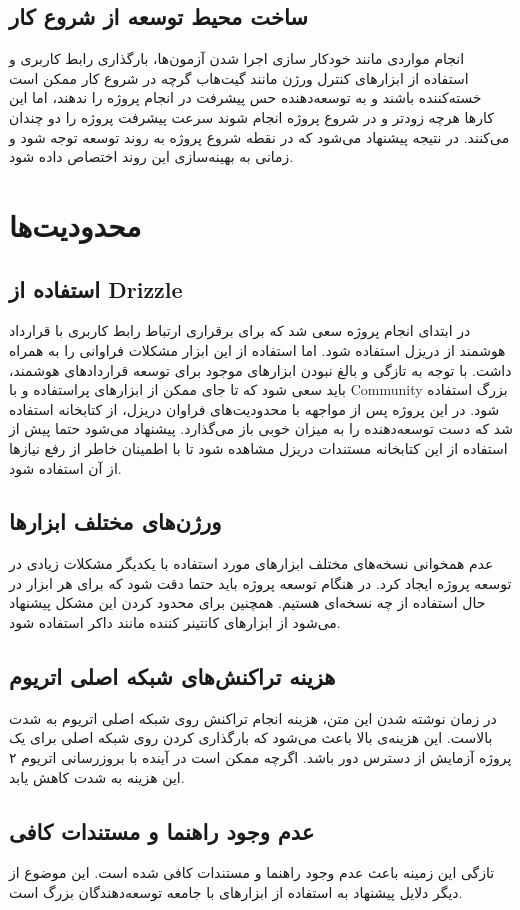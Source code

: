 \subsection{ساخت محیط توسعه از شروع کار}
انجام مواردی مانند خودکار سازی اجرا شدن آزمون‌ها،
بارگذاری رابط کاربری و استفاده از ابزارهای کنترل ورژن مانند گیت‌هاب
گرچه در شروع کار ممکن است خسته‌کننده باشند و به توسعه‌دهنده حس پیشرفت در انجام پروژه را ندهند، اما
این کارها هرچه زودتر و در شروع پروژه انجام شوند سرعت پیشرفت پروژه را دو چندان می‌کنند.
در نتیجه پیشنهاد می‌شود که در نقطه شروع پروژه به روند توسعه توجه شود و زمانی به
بهینه‌سازی این روند اختصاص داده شود.


\section{محدودیت‌ها}

\subsection{استفاده از
\gls{Drizzle}
}
در ابتدای انجام پروژه سعی شد که برای برقراری ارتباط رابط کاربری با قرارداد هوشمند از دریزل استفاده شود.
اما استفاده از این ابزار مشکلات فراوانی را به همراه داشت.
با توجه به تازگی و بالغ نبودن ابزارهای موجود برای توسعه قراردادهای هوشمند،
باید سعی شود که تا جای ممکن از ابزارهای پراستفاده و با
\gls{Community}
بزرگ استفاده شود. در این پروژه پس از مواجهه با محدودیت‌های فراوان دریزل،
از کتابخانه‌  استفاده شد که دست توسعه‌دهنده را به میزان خوبی باز می‌گذارد.
پیشنهاد می‌شود حتما پیش از استفاده از این کتابخانه مستندات دریزل
\cite{DrizzleDocs}
مشاهده شود تا با اطمینان خاطر از رفع نیازها از آن استفاده شود.

\subsection{ورژن‌های مختلف ابزارها}
عدم همخوانی نسخه‌های مختلف ابزارهای مورد استفاده با یکدیگر مشکلات زیادی در توسعه پروژه ایجاد کرد.
در هنگام توسعه پروژه باید حتما دقت شود که برای هر ابزار در حال استفاده از چه نسخه‌ای هستیم.
همچنین برای محدود کردن این مشکل پیشنهاد می‌شود از ابزارهای کانتینر کننده مانند داکر استفاده شود.

\subsection{هزینه تراکنش‌های شبکه اصلی اتریوم}
در زمان نوشته شدن این متن، هزینه انجام تراکنش روی شبکه اصلی اتریوم به شدت بالاست.
این هزینه‌ی بالا باعث می‌شود که بارگذاری کردن روی شبکه اصلی برای یک پروژه آزمایش از دسترس دور باشد.
اگرچه ممکن است در آینده با بروزرسانی اتریوم ۲ این هزینه به شدت کاهش یابد.

\subsection{عدم وجود راهنما و مستندات کافی}
تازگی این زمینه باعث عدم وجود راهنما و مستندات کافی شده است.
این موضوع از دیگر دلایل پیشنهاد به استفاده از ابزارهای با جامعه توسعه‌دهندگان بزرگ است.
